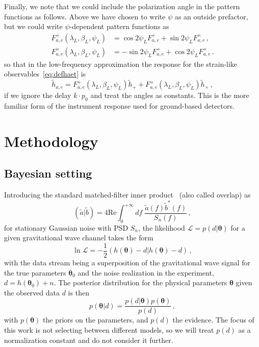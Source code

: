 \documentclass[aps,showpacs,twocolumn,prd,superscriptaddress,nofootinbib]{revtex4-1}
\newcommand{\be}{\begin{equation}}
\newcommand{\ee}{\end{equation}}
\newcommand{\bsub}{\begin{subequations}}
\newcommand{\esub}{\end{subequations}}
\newcommand\calL{{\mathcal{L}}}
\newcommand\betaL{{\beta_{L}}}
\newcommand\lambdaL{{\lambda_{L}}}
\newcommand\psiL{{\psi_{L}}}
\begin{document}
Finally, we note that we could include the polarization angle in the pattern functions as follows. Above we have chosen to write $\psi$ as an outside prefactor, but we could write $\psi$-dependent pattern functions as
\bsub
\begin{align}
	F^{+}_{a,e}(\lambdaL, \betaL, \psiL) &= \cos 2\psiL F^{+}_{a,e} + \sin 2\psiL F^{\times}_{a,e} \,,\\
	F^{\times}_{a,e}(\lambdaL, \betaL, \psiL) &= -\sin 2\psiL F^{+}_{a,e} + \cos 2\psiL F^{\times}_{a,e} \,.
\end{align}
\esub
so that in the low-frequency approximation the response for the strain-like observables~\eqref{eq:defhaet} is
\be
	\tilde{h}_{a,e} = F^{+}_{a,e}(\lambdaL, \betaL, \psiL) \tilde{h}_{+} + F^{\times}_{a,e}(\lambdaL, \betaL, \psiL) \tilde{h}_{\times} \,,
\ee
if we ignore the delay $k \cdot p_{0}$ and treat the angles as constants. This is the more familiar form of the instrument response used for ground-based detectors.



\section{Methodology}
\label{sec:method}


\subsection{Bayesian setting}
\label{subsec:bayes}

Introducing the standard matched-filter inner product~\cite{FlanaganHughes05} (also called overlap) as
\be\label{eq:definnerproduct}
	( \tilde{a} | \tilde{b} ) = 4 \mathrm{Re} \int_{0}^{+\infty} df \; \frac{\tilde{a}(f) \tilde{b}^{*}(f)}{S_{n}(f)} \,,
\ee
for stationary Gaussian noise with PSD $S_{n}$, the likelihood $\calL = p(d | \bm{\theta})$ for a given gravitational wave channel takes the form
\be\label{eq:deflnL}
	\ln \calL = -\frac{1}{2} \left( h(\bm{\theta}) - d | h(\bm{\theta}) - d \right) \,,
\ee
with the data stream being a superposition of the gravitational wave signal for the true parameters $\bm{\theta}_{0}$ and the noise realization in the experiment, $d = h(\bm{\theta}_{0}) + n$.
The posterior distribution for the physical parameters $\bm{\theta}$ given the observed data $d$ is then \be\label{eq:defBayes}
	p\left( \bm{\theta} | d \right) = \frac{p(d | \bm{\theta})p(\bm{\theta})}{p(d)}\,,
\ee
with $p(\bm{\theta})$ the priors on the parameters, and $p(d)$ the evidence.
The focus of this work is not selecting between different models, so we will treat $p(d)$ as a normalization constant and do not consider it further.
\end{document}
